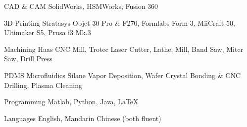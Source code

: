 


\begin{cvskills}


\cvskill
{CAD \& CAM} %
{SolidWorks, HSMWorks, Fusion 360} %


\cvskill
{3D Printing} %
{Stratasys Objet 30 Pro \& F270, Formlabs Form 3, MiiCraft 50, Ultimaker S5, Prusa i3 Mk.3} %

\cvskill
{Machining}
{Haas CNC Mill, Trotec Laser Cutter, Lathe, Mill, Band Saw, Miter Saw, Drill Press}

\cvskill
{PDMS Microfluidics}
{Silane Vapor Deposition, Wafer Crystal Bonding \& CNC Drilling, Plasma Cleaning}

\cvskill
{Programming} %
{Matlab, Python, Java, LaTeX} %

\cvskill
{Languages}
{English, Mandarin Chinese (both fluent)}


\end{cvskills}